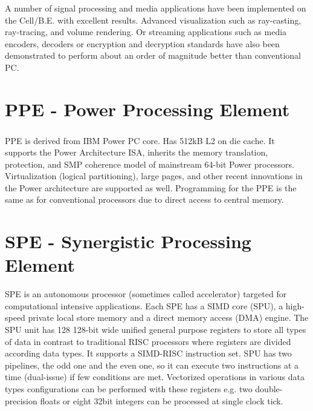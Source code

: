 A number of signal processing and media applications have been implemented on the Cell/B.E. with excellent results.
Advanced visualization such as ray-casting, ray-tracing, and volume rendering.
Or streaming applications such as media encoders, decoders or encryption and decryption standards have also been demonstrated to perform about an order of magnitude better than conventional PC.


\section{PPE - Power Processing Element}
PPE is derived from IBM Power PC\textsuperscript{\textregistered} core. Has 512kB L2 on die cache.
It supports the Power Architecture ISA, inherits the memory translation, protection, and SMP coherence model of mainstream 64-bit Power processors.
Virtualization (logical partitioning), large pages, and other recent innovations in the Power architecture are supported as well.
Programming for the PPE is the same as for conventional processors due to direct access to central memory.

\section{SPE - Synergistic Processing Element}

\par
SPE is an autonomous processor (sometimes called accelerator) targeted for computational intensive applications.
Each SPE has a SIMD core (SPU), a high-speed private local store memory and a direct memory access (DMA) engine.
The SPU unit has 128 128-bit wide unified general purpose registers to store all types of data in contrast to traditional RISC processors where registers are divided according data types.
It supports a SIMD-RISC instruction set.
SPU has two pipelines, the odd one and the even one, so it can execute two instructions at a time (dual-issue) if few conditions are met.
Vectorized operations in various data types configurations can be performed with these registers e.g. two double-precision floats or eight 32bit integers can be processed at single clock tick.

